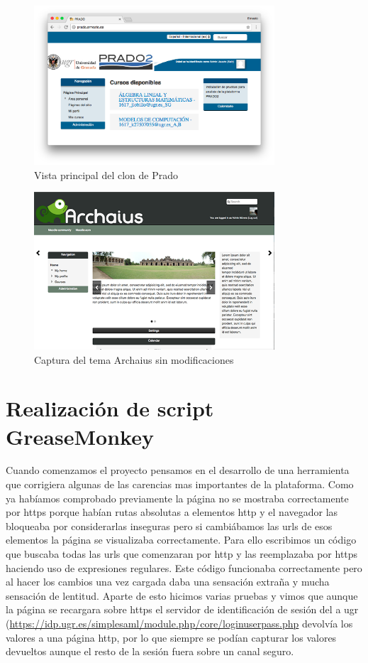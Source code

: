 \begin{figure}[H]
\centering
\includegraphics[width=0.8\textwidth]{../screenshots/pradoernesto}
\caption{Vista principal del clon de Prado}
\label{fig:pradoernesto}
\end{figure}

\begin{figure}[H]
\centering
\includegraphics[width=0.8\textwidth]{../screenshots/archaius}
\caption{Captura del tema Archaius sin modificaciones}
\label{fig:archaius}
\end{figure}




\section{Realización de script GreaseMonkey}

Cuando comenzamos el proyecto pensamos en el desarrollo de una herramienta que corrigiera algunas de las carencias mas importantes de la plataforma. 
Como ya habíamos comprobado previamente la página no se mostraba correctamente por https porque habían rutas absolutas a elementos http y el navegador las bloqueaba por considerarlas inseguras pero si cambiábamos las urls de esos elementos la página se visualizaba correctamente.
Para ello escribimos un código que buscaba todas las urls que comenzaran por http y las reemplazaba por https haciendo uso de expresiones regulares. Este código funcionaba correctamente pero al hacer los cambios una vez cargada daba una sensación extraña y mucha sensación de lentitud. Aparte de esto hicimos varias pruebas y vimos que aunque la página se recargara sobre https el servidor de identificación de sesión del a ugr (\url{https://idp.ugr.es/simplesaml/module.php/core/loginuserpass.php} devolvía los valores a una página http, por lo que siempre se podían capturar los valores devueltos aunque el resto de la sesión fuera sobre un canal seguro. 

